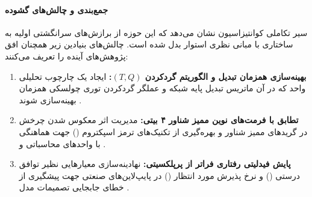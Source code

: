 \paragraph*{جمع‌بندی و چالش‌های گشوده}
سیر تکاملی کوانتیزاسیون نشان می‌دهد که این حوزه از برازش‌های سرانگشتی اولیه به ساختاری با مبانی نظری استوار بدل شده است. چالش‌های بنیادین زیر همچنان افق پژوهش‌های آینده را تعریف می‌کنند:
\begin{enumerate}
    \item \textbf{بهینه‌سازی همزمان تبدیل و الگوریتم گردکردن $(T, Q)$:} ایجاد یک چارچوب تحلیلی واحد که در آن ماتریس تبدیل پایه شبکه و عملگر گردکردن توری چولسکی همزمان بهینه‌سازی شوند \cite{jokar2026transforms}.
    \item \textbf{تطابق با فرمت‌های نوین ممیز شناور ۴ بیتی:} مدیریت اثر معکوس شدن چرخش در گرید‌های ممیز شناور و بهره‌گیری از تکنیک‌های ترمز اسپکتروم () جهت هماهنگی با واحدهای محاسباتی  و  \cite{jokar2026transforms, whalen2026kbbq}.
    \item \textbf{پایش فیدلیتی رفتاری فراتر از پرپلکسیتی:} نهادینه‌سازی معیارهایی نظیر توافق درستی () و نرخ پذیرش مورد انتظار () در پایپ‌لاین‌های صنعتی جهت پیشگیری از خطای جابجایی تصمیمات مدل \cite{rababah2026illusion, helcig2026statistically}.
\end{enumerate}